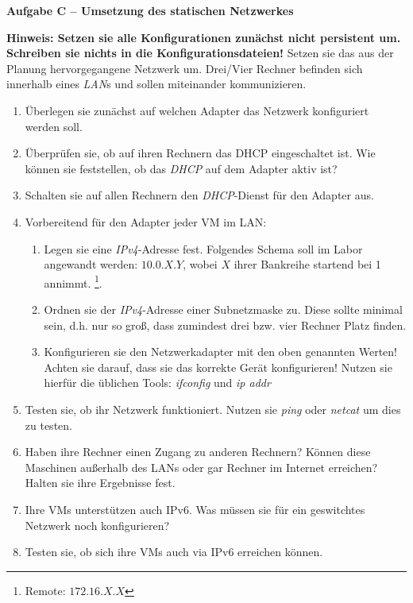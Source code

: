 \documentclass[paper=a4,fontsize=11pt]{scrartcl}%
\begin{document}
\begin{center}\Large{\textbf{Aufgabe C -- Umsetzung des statischen Netzwerkes}}\end{center}\vskip0.25in
\textbf{Hinweis: Setzen sie alle Konfigurationen zunächst nicht persistent um. Schreiben sie nichts in die Konfigurationsdateien!}
Setzen sie das aus der Planung hervorgegangene Netzwerk um. Drei/Vier Rechner befinden sich innerhalb eines \emph{LAN}s und sollen miteinander kommunizieren.
\begin{enumerate}
	\item Überlegen sie zunächst auf welchen Adapter das Netzwerk konfiguriert werden soll.
	\item Überprüfen sie, ob auf ihren Rechnern das DHCP eingeschaltet ist. Wie können sie feststellen, ob das \emph{DHCP} auf dem Adapter aktiv ist?
	\item Schalten sie auf allen Rechnern den \emph{DHCP}-Dienst für den Adapter aus.
	\item Vorbereitend für den Adapter jeder VM im LAN:
	\begin{enumerate}
		\item Legen sie eine \emph{IPv4}-Adresse fest. Folgendes Schema soll im Labor angewandt werden: $10.0.X.Y$, wobei $X$ ihrer Bankreihe startend bei 1 annimmt. \footnote{Remote: $172.16.X.X$}.
		\item Ordnen sie der \emph{IPv4}-Adresse einer Subnetzmaske zu. Diese sollte minimal sein, d.h. nur so groß, dass zumindest drei bzw. vier Rechner Platz finden.
		\item Konfigurieren sie den Netzwerkadapter mit den oben genannten Werten!\\
		Achten sie darauf, dass sie das korrekte Gerät konfigurieren! Nutzen sie hierfür die üblichen Tools: \emph{ifconfig} und \emph{ip addr}
	\end{enumerate}
	\item Testen sie, ob ihr Netzwerk funktioniert. Nutzen sie \emph{ping} oder \emph{netcat} um dies zu testen.
	\item Haben ihre Rechner einen Zugang zu anderen Rechnern? Können diese Maschinen außerhalb des LANs oder gar Rechner im Internet erreichen? Halten sie ihre Ergebnisse fest.
	\item Ihre VMs unterstützen auch IPv6. Was müssen sie für ein geswitchtes Netzwerk noch konfigurieren?
	\item Testen sie, ob sich ihre VMs auch via IPv6 erreichen können.
\end{enumerate}
\end{document}
